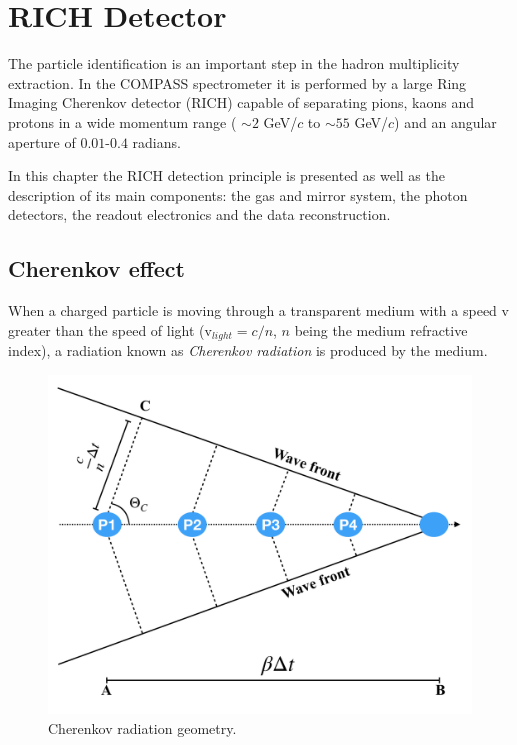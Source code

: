 
\chapter{RICH Detector}
\label{ch:RICH} %


The particle identification is an important step in the hadron multiplicity extraction. In the COMPASS spectrometer it is performed by a large Ring Imaging Cherenkov detector (RICH) capable of separating pions, kaons and protons in a wide momentum range ( $\sim$$2$ GeV/$c$ to $\sim$$55$ GeV/$c$) and an angular aperture of $0.01$-$0.4$ radians.

In this chapter the RICH detection principle is presented as well as the description of its main components: the gas and mirror system, the photon detectors, the readout electronics and the data reconstruction.

\section{Cherenkov effect}

When a charged particle is moving through a transparent medium with a speed v greater than the speed of light (v$_{light} = c/n$, $n$ being the medium refractive index), a radiation known as \textit{Cherenkov radiation} is produced by the medium.

\begin{figure}[!h]
  \centering
	\includegraphics[scale=0.5]{./gfx/CherenkovGeom.png}
	\caption{Cherenkov radiation geometry.}
	\label{pic:CherenkovGeom}
\end{figure}

